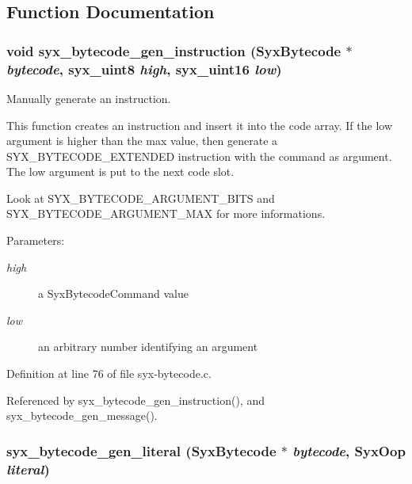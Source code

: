 \subsection{Function Documentation}
\hypertarget{syx-bytecode_8c_ffb00acd600dc431d1cfe10edae1ee69}{
\subsubsection{\setlength{\rightskip}{0pt plus 5cm}void syx\_\-bytecode\_\-gen\_\-instruction ({\bf SyxBytecode} $\ast$ {\em bytecode}, \/  {\bf syx\_\-uint8} {\em high}, \/  {\bf syx\_\-uint16} {\em low})}}
\label{syx-bytecode_8c_ffb00acd600dc431d1cfe10edae1ee69}


Manually generate an instruction.

This function creates an instruction and insert it into the code array. If the low argument is higher than the max value, then generate a SYX\_\-BYTECODE\_\-EXTENDED instruction with the command as argument. The low argument is put to the next code slot.

Look at SYX\_\-BYTECODE\_\-ARGUMENT\_\-BITS and SYX\_\-BYTECODE\_\-ARGUMENT\_\-MAX for more informations.

\begin{Desc}
\item[Parameters:]
\begin{description}
\item[{\em high}]a SyxBytecodeCommand value \item[{\em low}]an arbitrary number identifying an argument \end{description}
\end{Desc}


Definition at line 76 of file syx-bytecode.c.

Referenced by syx\_\-bytecode\_\-gen\_\-instruction(), and syx\_\-bytecode\_\-gen\_\-message().\hypertarget{syx-bytecode_8c_ba09d19921e45c7b3a186762c622ead5}{
\subsubsection{ syx\_\-bytecode\_\-gen\_\-literal ({\bf SyxBytecode} $\ast$ {\em bytecode}, \/  {\bf SyxOop} {\em literal})}}
\label{syx-bytecode_8c_ba09d19921e45c7b3a186762c622ead5}


